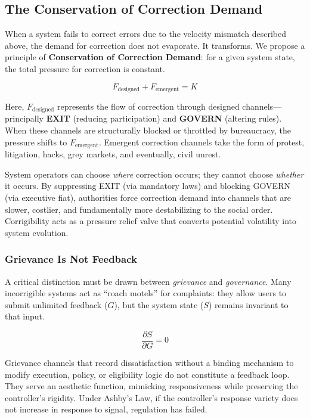 \documentclass{article}
\begin{document}
\subsection{The Conservation of Correction Demand}

When a system fails to correct errors due to the velocity mismatch described above, the demand for correction does not evaporate. It transforms. We propose a principle of \textbf{Conservation of Correction Demand}: for a given system state, the total pressure for correction is constant.

\begin{equation}
F_{\text{designed}} + F_{\text{emergent}} = K
\end{equation}

Here, $F_{\text{designed}}$ represents the flow of correction through designed channels---principally \textbf{EXIT} (reducing participation) and \textbf{GOVERN} (altering rules). When these channels are structurally blocked or throttled by bureaucracy, the pressure shifts to $F_{\text{emergent}}$. Emergent correction channels take the form of protest, litigation, hacks, grey markets, and eventually, civil unrest.

System operators can choose \textit{where} correction occurs; they cannot choose \textit{whether} it occurs. By suppressing EXIT (via mandatory laws) and blocking GOVERN (via executive fiat), authorities force correction demand into channels that are slower, costlier, and fundamentally more destabilizing to the social order. Corrigibility acts as a pressure relief valve that converts potential volatility into system evolution.

\subsubsection{Grievance Is Not Feedback}
\label{subsec:grievance}

A critical distinction must be drawn between \textit{grievance} and \textit{governance}. Many incorrigible systems act as ``roach motels'' for complaints: they allow users to submit unlimited feedback ($G$), but the system state ($S$) remains invariant to that input.

\begin{equation}
\frac{\partial S}{\partial G} = 0
\end{equation}

Grievance channels that record dissatisfaction without a binding mechanism to modify execution, policy, or eligibility logic do not constitute a feedback loop. They serve an aesthetic function, mimicking responsiveness while preserving the controller's rigidity. Under Ashby's Law, if the controller's response variety does not increase in response to signal, regulation has failed.
\end{document}
